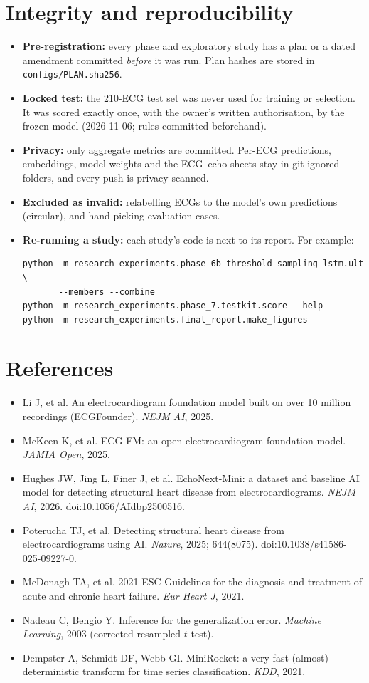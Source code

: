 \section{Integrity and reproducibility}\label{app:repro}
\begin{itemize}
  \item \textbf{Pre-registration:} every phase and exploratory study has a plan or a dated amendment committed
    \emph{before} it was run. Plan hashes are stored in \texttt{configs/PLAN.sha256}.
  \item \textbf{Locked test:} the 210-ECG test set was never used for training or selection. It was scored exactly
    once, with the owner's written authorisation, by the frozen model (2026-11-06; rules committed beforehand).
  \item \textbf{Privacy:} only aggregate metrics are committed. Per-ECG predictions, embeddings, model weights and
    the ECG--echo sheets stay in git-ignored folders, and every push is privacy-scanned.
  \item \textbf{Excluded as invalid:} relabelling ECGs to the model's own predictions (circular), and hand-picking
    evaluation cases.
  \item \textbf{Re-running a study:} each study's code is next to its report. For example:
{\footnotesize
\begin{verbatim}
python -m research_experiments.phase_6b_threshold_sampling_lstm.ult \
       --members --combine
python -m research_experiments.phase_7.testkit.score --help
python -m research_experiments.final_report.make_figures
\end{verbatim}}
\end{itemize}

\section*{References}
\begin{itemize}
  \item Li J, et al. An electrocardiogram foundation model built on over 10 million recordings (ECGFounder).
    \emph{NEJM AI}, 2025.
  \item McKeen K, et al. ECG-FM: an open electrocardiogram foundation model. \emph{JAMIA Open}, 2025.
  \item Hughes JW, Jing L, Finer J, et al. EchoNext-Mini: a dataset and baseline AI model for detecting structural
    heart disease from electrocardiograms. \emph{NEJM AI}, 2026. doi:10.1056/AIdbp2500516.
  \item Poterucha TJ, et al. Detecting structural heart disease from electrocardiograms using AI. \emph{Nature}, 2025;
    644(8075). doi:10.1038/s41586-025-09227-0.
  \item McDonagh TA, et al. 2021 ESC Guidelines for the diagnosis and treatment of acute and chronic heart failure.
    \emph{Eur Heart J}, 2021.
  \item Nadeau C, Bengio Y. Inference for the generalization error. \emph{Machine Learning}, 2003 (corrected
    resampled $t$-test).
  \item Dempster A, Schmidt DF, Webb GI. MiniRocket: a very fast (almost) deterministic transform for time series
    classification. \emph{KDD}, 2021.
\end{itemize}

